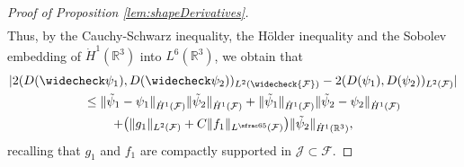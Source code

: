 \documentclass[JEP,XML,SOM,Unicode, NoEqCountersInSection,NoFloatCountersInSection,published]{cedram}
\newcommand{\R}{\mathbb{R}}
\theoremstyle{definition}
\theoremstyle{remark}
\begin{document}
\begin{proof}[Proof of Proposition \ref{lem:shapeDerivatives}]
\begin{align*}
\end{align*}
Thus, by the Cauchy-Schwarz inequality, the Hölder inequality and the Sobolev embedding of $\dot H^1 (\R^3)$ into $L^6 (\R^3)$, we obtain that
\begin{multline} \label{midi1}
|2(D(\widecheck \psi_1), D(\widecheck \psi_2))_{L^2(\widecheck{\mathcal F})} - 2(D(\psi_1), D(\psi_2))_{L^2(\mathcal F)}|\\
\hspace*{.6cm}\leq \|\tilde \psi_1 - \psi_1\|_{\dot H^1(\mathcal F)} \|\tilde \psi_2\|_{\dot H^1(\mathcal F)} + \|\tilde \psi_1\|_{\dot H^1(\mathcal F)} \|\tilde \psi_2 - \psi_2\|_{\dot H^1(\mathcal F)}\\
+ \bigl(\|g_1\|_{L^2(\mathcal F)} + C \|f_1\|_{L^{\sfrac 6 5 }(\mathcal F)}\bigr) \|\tilde \psi_2\|_{\dot H^1 (\R^3)},
\end{multline}
recalling that $g_1$ and $f_1$ are compactly supported in $ \mathcal J \subset \mathcal F$.


\end{proof}
\end{document}
